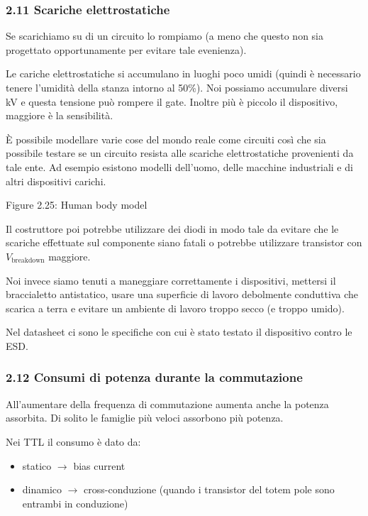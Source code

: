 \documentclass[
]{article}
\providecommand{\tightlist}{%
  \setlength{\itemsep}{0pt}\setlength{\parskip}{0pt}}
\begin{document}
\subsubsection{2.11 Scariche
elettrostatiche}\label{scariche-elettrostatiche}

Se scarichiamo su di un circuito lo rompiamo (a meno che questo non sia
progettato opportunamente per evitare tale evenienza).

Le cariche elettrostatiche si accumulano in luoghi poco umidi (quindi è
necessario tenere l'umidità della stanza intorno al 50\%). Noi possiamo
accumulare diversi kV e questa tensione può rompere il gate. Inoltre più
è piccolo il dispositivo, maggiore è la sensibilità.

È possibile modellare varie cose del mondo reale come circuiti così che
sia possibile testare se un circuito resista alle scariche
elettrostatiche provenienti da tale ente. Ad esempio esistono modelli
dell'uomo, delle macchine industriali e di altri dispositivi carichi.

Figure 2.25: Human body model

Il costruttore poi potrebbe utilizzare dei diodi in modo tale da evitare
che le scariche effettuate sul componente siano fatali o potrebbe
utilizzare transistor con \(V_{\text{breakdown}}\) maggiore.

Noi invece siamo tenuti a maneggiare correttamente i dispositivi,
mettersi il braccialetto antistatico, usare una superficie di lavoro
debolmente conduttiva che scarica a terra e evitare un ambiente di
lavoro troppo secco (e troppo umido).

Nel datasheet ci sono le specifiche con cui è stato testato il
dispositivo contro le ESD.

\subsubsection{2.12 Consumi di potenza durante la
commutazione}\label{consumi-di-potenza-durante-la-commutazione}

All'aumentare della frequenza di commutazione aumenta anche la potenza
assorbita. Di solito le famiglie più veloci assorbono più potenza.

Nei TTL il consumo è dato da:

\begin{itemize}
\tightlist
\item
  statico \(\rightarrow\) bias current
\item
  dinamico \(\rightarrow\) cross-conduzione (quando i transistor del
  totem pole sono entrambi in conduzione)
\end{itemize}
\end{document}
